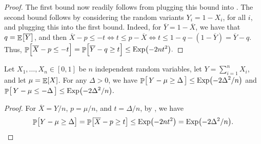 \begin{proof}
    The first bound now readily follows from plugging this bound into
    . The second bound follows by considering the
    random variants $Y_i =1-X_i$, for all $i$, and plugging this into the
    first bound. Indeed, for $\overline{Y} = 1-\overline{X}$, we have
    that $q = \mathop{\mathbb{E}}\!\left[ {\overline{Y}} \right]$, and then
    \begin{math}
        \overline{X} - p \leq -t%
        \iff%
        t \leq p - \overline{X}%
        \iff%
        t \leq 1-q - (1- \overline{Y}) = \overline{Y} - q.
    \end{math}
    Thus, 
    \begin{math}%
        \ds%
        \Prob{\Bigl.\overline{X} - p \leq -t }%
        = \Prob{\Bigl.\overline{Y} - q \geq t }%
        \leq%
        \Exp\pth{ -2 n t^2}.
    \end{math}
\end{proof}

\begin{corollary}
    Let $X_1, \ldots, X_n \in [0,1]$ be $n$ independent random
    variables, let $Y = \sum_{i=1}^n X_i$, and let $\mu = \mathop{\mathbb{E}}\!\left[ {X} \right]$. For
    any $\Delta > 0$, we have
    \begin{math}%
        \ds%
        \Prob{\bigl.\,Y - \mu \geq \Delta\, }%
        \leq%
        \Exp\pth{ -2 \Delta^2/n}
    \end{math}
    and 
    \begin{math}%
        \ds%
        \Prob{\bigl.\, Y - \mu \leq -\Delta \, }%
        \leq%
        \Exp\pth{ -2 \Delta^2/n}.
    \end{math}
\end{corollary}

\begin{proof}
    For $\overline{X} = Y/n$, $p =\mu /n $, and $t = \Delta/n$, by
    , we have
    \begin{equation*}
        \Prob{\bigl.Y - \mu \geq \Delta }%
        =%
        \Prob{\bigl. \smash{\overline{X}} - p \geq t }%
        \ds%
        \leq%
        \Exp\pth{ -2 nt^2 }
        =%
        \Exp\pth{ -2 \Delta^2 /n  }.
    \end{equation*}
\end{proof}


